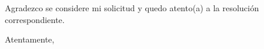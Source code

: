 \documentclass[a4paper,12pt]{article}
\begin{document}
\vspace{0.5cm}

\noindent Agradezco se considere mi solicitud y quedo atento(a) a la resolución correspondiente.

\noindent Atentamente,

\vspace{2.5cm}


\noindent{}  

\noindent{}      

\noindent{}  

\noindent{} 
\end{document}
